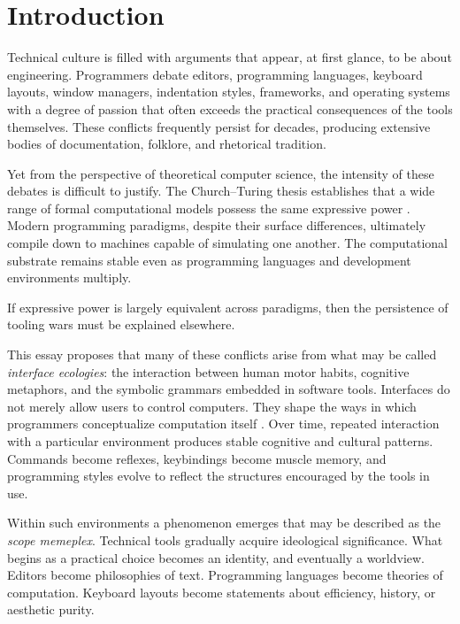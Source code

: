 \documentclass[12pt]{article}
\theoremstyle{definition}
\begin{document}
\newpage
\tableofcontents
\newpage

\section{Introduction}

Technical culture is filled with arguments that appear, at first glance,
to be about engineering. Programmers debate editors, programming
languages, keyboard layouts, window managers, indentation styles,
frameworks, and operating systems with a degree of passion that often
exceeds the practical consequences of the tools themselves. These
conflicts frequently persist for decades, producing extensive bodies of
documentation, folklore, and rhetorical tradition.

Yet from the perspective of theoretical computer science, the intensity
of these debates is difficult to justify. The Church--Turing thesis
establishes that a wide range of formal computational models possess the
same expressive power \cite{turing1936,kleene1952}. Modern programming
paradigms, despite their surface differences, ultimately compile down to
machines capable of simulating one another. The computational substrate
remains stable even as programming languages and development environments
multiply.

If expressive power is largely equivalent across paradigms, then the
persistence of tooling wars must be explained elsewhere.

This essay proposes that many of these conflicts arise from what may be
called \emph{interface ecologies}: the interaction between human motor
habits, cognitive metaphors, and the symbolic grammars embedded in
software tools. Interfaces do not merely allow users to control
computers. They shape the ways in which programmers conceptualize
computation itself \cite{norman1988}. Over time, repeated interaction
with a particular environment produces stable cognitive and cultural
patterns. Commands become reflexes, keybindings become muscle memory,
and programming styles evolve to reflect the structures encouraged by
the tools in use.

Within such environments a phenomenon emerges that may be described as
the \emph{scope memeplex}. Technical tools gradually acquire ideological
significance. What begins as a practical choice becomes an identity,
and eventually a worldview. Editors become philosophies of text.
Programming languages become theories of computation. Keyboard layouts
become statements about efficiency, history, or aesthetic purity.
\end{document}
